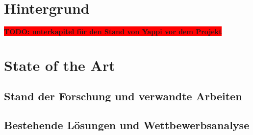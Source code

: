 \documentclass[12pt,a4paper]{report}
\newcommand{\todo}[1]{\colorbox{red}{\textbf{TODO: #1}}\\}
\begin{document}
\chapter{Hintergrund}
\todo{unterkapitel für den Stand von Yappi vor dem Projekt}

\chapter{State of the Art}
\section{Stand der Forschung und verwandte Arbeiten}
\section{Bestehende Lösungen und Wettbewerbsanalyse}
\end{document}
